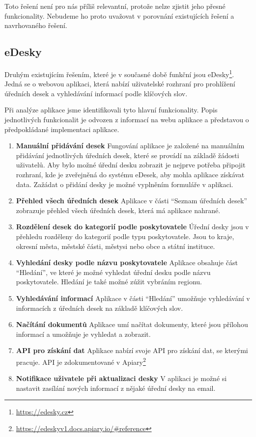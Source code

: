Toto řešení není pro nás příliš relevantní, protože nelze zjistit jeho přesné funkcionality. Nebudeme ho proto uvažovat v porovnání existujících řešení a navrhovaného řešení.

\subsection{eDesky}

Druhým existujícím řešením, které je v současné době funkční jsou eDesky\footnote{\url{https://edesky.cz}}. Jedná se o webovou aplikaci, která nabízí uživatelské rozhraní pro prohlížení úředních desek a vyhledávání informací podle klíčových slov.

Při analýze aplikace jsme identifikovali tyto hlavní funkcionality. Popis jednotlivých funkcionalit je odvozen z informací na webu aplikace a představou o předpokládané implementaci aplikace. 

\begin{enumerate}
    \item \textbf{Manuální přidávání desek} Fungování aplikace je založené na manuálním přidávání jednotlivých úředních desek, které se provádí na základě žádosti uživatelů. Aby bylo možné úřední desku zobrazit je nejprve potřeba připojit rozhraní, kde je zveřejněná do systému eDesek, aby mohla aplikace získávat data. Zažádat o přidání desky je možné vyplněním formuláře v aplikaci. 
    
    \item \textbf{Přehled všech úředních desek} Aplikace v části ``Seznam úředních desek'' zobrazuje přehled všech úředních desek, která má aplikace nahrané.
    
    \item  \textbf{Rozdělení desek do kategorií podle poskytovatele} Úřední desky jsou v přehledu rozděleny do kategorií podle typu poskytovatele. Jsou to kraje, okresní města, městské části, městysi nebo obce a státní instituce.
    
    \item  \textbf{Vyhledání desky podle názvu poskytovatele} Aplikace obsahuje část ``Hledání'', ve které je možné vyhledat úřední desku podle názvu poskytovatele. Hledání je také možné zúžit vybráním regionu.
    
    \item \textbf{Vyhledávání informací} Aplikace v části ``Hledání'' umožňuje vyhledávání v informacích z úředních desek na základě klíčových slov.
    
    \item \textbf{Načítání dokumentů} Aplikace umí načítat dokumenty, které jsou přílohou informací a umožňuje je vyhledat a zobrazit.
    
    \item \textbf{API pro získání dat} Aplikace nabízí svoje API pro získání dat, se kterými pracuje. API je zdokumentované v Apiary\footnote{\url{https://edeskyv1.docs.apiary.io/\#reference}}
    
    \item \textbf{Notifikace uživatele při aktualizaci desky} V aplikaci je možné si nastavit zasílání nových informací z nějaké úřední desky na email.
\end{enumerate}

